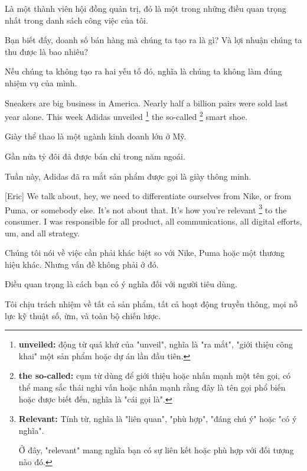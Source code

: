 \documentclass[a4paper]{article}
\begin{document}
	\begin{vietnamese-v2}
		Là một thành viên hội đồng quản trị, đó là một trong những điều quan trọng nhất trong danh sách công việc của tôi.
		
		Bạn biết đấy, doanh số bán hàng mà chúng ta tạo ra là gì? Và lợi nhuận chúng ta thu được là bao nhiêu?
		
		Nếu chúng ta không tạo ra hai yếu tố đó, nghĩa là chúng ta không làm đúng nhiệm vụ của mình.
	\end{vietnamese-v2}
	
	
	Sneakers are big business in America. 
	Nearly half a billion pairs were sold last year alone. 
	This week Adidas unveiled  \footnote{
		\textbf{unveiled:} động từ quá khứ của "unveil", nghĩa là "ra mắt", "giới thiệu công khai" một sản phẩm hoặc dự án lần đầu tiên.
		
	} the so-called \footnote{
	
	\textbf{the so-called:} cụm từ dùng để giới thiệu hoặc nhấn mạnh một tên gọi, có thể mang sắc thái nghi vấn hoặc nhấn mạnh rằng đây là tên gọi phổ biến hoặc được biết đến, nghĩa là "cái gọi là".
	
	} smart shoe.
	
	\begin{vietnamese-v2}
		Giày thể thao là một ngành kinh doanh lớn ở Mỹ.  
		
		Gần nửa tỷ đôi đã được bán chỉ trong năm ngoái.  
		
		Tuần này, Adidas đã ra mắt sản phẩm được gọi là giày thông minh.
	\end{vietnamese-v2}
	
	
	[Eric] We talk about, hey, we need to differentiate ourselves from Nike, or from Puma, or somebody else. It's not about that.
	It's how you're relevant  \footnote{
		\textbf{Relevant:} Tính từ, nghĩa là "liên quan", "phù hợp", "đáng chú ý" hoặc "có ý nghĩa".
		
		Ở đây, "relevant" mang nghĩa bạn có sự liên kết hoặc phù hợp với đối tượng nào đó.
	} to the consumer. I was responsible for all product, all communications, all digital efforts, um, and all strategy.
	
	\begin{vietnamese-v2}
		[Eric] Chúng tôi nói về việc cần phải khác biệt so với Nike, Puma hoặc một thương hiệu khác. Nhưng vấn đề không phải ở đó.
		
		Điều quan trọng là cách bạn có ý nghĩa đối với người tiêu dùng.
		
		Tôi chịu trách nhiệm về tất cả sản phẩm, tất cả hoạt động truyền thông, mọi nỗ lực kỹ thuật số, ừm, và toàn bộ chiến lược.
	\end{vietnamese-v2}
	
\end{document}
